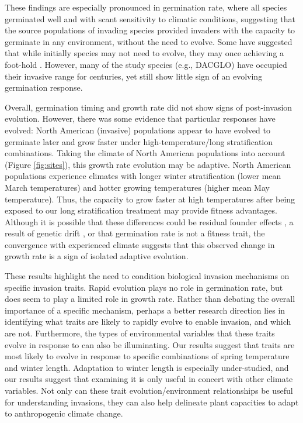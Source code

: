 \documentclass[12pt]{article}\usepackage[]{graphicx}\usepackage[]{color}
\begin{document}
	These findings are  especially pronounced in germination rate, where all species germinated well and with scant sensitivity to climatic conditions, suggesting that the source populations of invading species provided invaders with the capacity to germinate in any environment, without the need to evolve. Some have suggested that while initially species may not need to evolve, they may once achieving a foot-hold \parencite{Lamarque2015}. However, many of the study species (e.g., DACGLO) have occupied their invasive range for centuries, yet still show little sign of an evolving germination response. 
	
	Overall, germination timing and growth rate did not show signs of post-invasion evolution. However, there was some evidence that particular responses have evolved: North American (invasive) populations appear to have evolved to germinate later and grow faster under high-temperature/long stratification combinations. Taking the climate of North American populations into account (Figure \ref{fig:sites}), this growth rate evolution may be adaptive. North American populations experience climates with longer winter stratification  (lower mean March temperatures) and hotter growing temperatures (higher mean May temperature). Thus, the capacity to grow faster at high temperatures after being exposed to our long stratification treatment may provide fitness advantages. Although it is  possible that these differences could be residual founder effects \parencite{Shirk2014}, a result of genetic drift \parencite{Eckert1996}, or that germination rate is not a fitness trait,  the convergence with experienced climate suggests that this observed change in growth rate is a sign of isolated adaptive evolution. 
	
	These results highlight the need to condition biological invasion mechanisms on specific invasion traits. Rapid evolution plays no role in germination rate, but does seem to play a limited role in growth rate. Rather than debating the overall importance of a specific mechanism, perhaps a better research direction lies in identifying what traits are likely to rapidly evolve to enable invasion, and which are not. Furthermore, the types of environmental variables that these traits evolve in response to can also be illuminating. Our results suggest that traits are most likely to evolve in response to specific combinations of spring temperature and winter length.  Adaptation to winter length is especially under-studied, and our results suggest that examining it is only useful in concert with other climate variables.  Not only can these trait evolution/environment relationships be useful for understanding invasions, they can also help delineate plant capacities to adapt to anthropogenic climate change.
	
\end{document}
